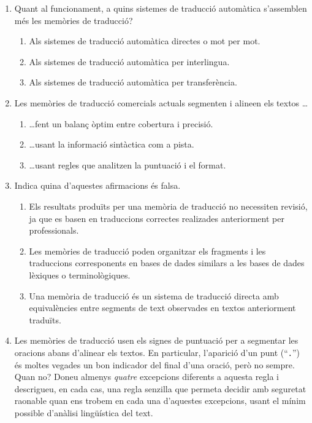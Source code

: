 \begin{enumerate}
\item Quant al funcionament, 
a quins sistemes de traducció automàtica s'assemblen més les
memòries de traducció?
\begin{enumerate}
\item Als sistemes de traducció automàtica directes o mot per mot.
\item Als sistemes de traducció automàtica per interlingua.
\item Als sistemes de traducció automàtica per transferència.
\end{enumerate}
\item Les memòries de traducció comercials actuals segmenten i alineen els textos
{\ldots}
\begin{enumerate}
\item {\ldots}fent un balanç òptim entre cobertura i precisió.
\item {\ldots}usant la informació sintàctica com a pista.
\item {\ldots}usant regles que analitzen la puntuació i el format.
\end{enumerate}

\item Indica quina d'aquestes afirmacions és falsa.
\begin{enumerate}
\item Els resultats produïts per una memòria de traducció no
     necessiten revisió, ja que es basen en traduccions correctes realizades
     anteriorment per professionals.
   \item Les memòries de traducció poden organitzar els fragments i
     les traduccions corresponents en bases de dades similars a les
     bases de dades lèxiques o terminològiques.
\item Una memòria de traducció és un sistema de traducció
     directa amb equivalències entre segments de text 
     observades en textos anteriorment traduïts.
\end{enumerate}

\item Les memòries de traducció usen els signes de puntuació per a 
     segmentar les oracions abans d'alinear els textos. En particular,
     l'aparició d'un punt (``\texttt{.}'') és moltes vegades un bon  
     indicador del final d'una oració, però no sempre. Quan no? Doneu
     almenys \emph{quatre} excepcions diferents a aquesta regla i   
     descrigueu, en cada cas, una regla senzilla que permeta decidir
     amb seguretat raonable quan ens trobem en cada una d'aquestes
     excepcions, usant el mínim possible d'anàlisi lingüística del
     text.


\end{enumerate}
